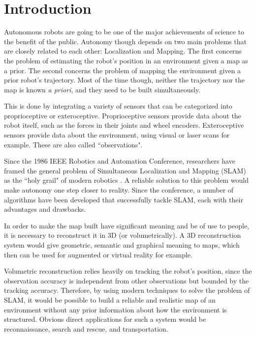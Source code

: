 \documentclass[11pt]{article}
\begin{document}
	\newpage
	\tableofcontents

	\newpage

	\section{Introduction}

Autonomous robots are going to be one of the major achievements of science to the benefit of the public. Autonomy though depends on two main problems that are closely related to each other: Localization and Mapping. The first concerns the problem of estimating the robot's position in an environment given a map as a prior. The second concerns the problem of mapping the environment given a prior robot's trajectory. Most of the time though, neither the trajectory nor the map is known \textit{a priori}, and they need to be built simultaneously. 

This is done by integrating a variety of sensors that can be categorized into proprioceptive or exteroceptive. Proprioceptive sensors provide data about the robot itself, such as the forces in their joints and wheel encoders. Exteroceptive sensors provide data about the environment, using visual or laser scans for example. These are also called ``observations".
	
Since the 1986 IEEE Robotics and Automation Conference, researchers have framed the general problem of Simultaneous Localization and Mapping (SLAM) as the ``holy grail" of modern robotics \cite{SLAMPartI}. A reliable solution to this problem would make autonomy one step closer to reality. Since the conference, a number of algorithms have been developed that successfully tackle SLAM, each with their advantages and drawbacks.
	
In order to make the map built have significant meaning and be of use to people, it is necessary to reconstruct it in 3D (or volumetrically). A 3D reconstruction system would give geometric, semantic and graphical meaning to maps, which then can be used for augmented or virtual reality for example.
	
Volumetric reconstruction relies heavily on tracking the robot's position, since the observation accuracy is independent from other observations but bounded by the tracking accuracy. Therefore, by using modern techniques to solve the problem of SLAM, it would be possible to build a reliable and realistic map of an environment without any prior information about how the environment is structured. Obvious direct applications for such a system would be reconnaissance, search and rescue, and transportation.
	
\end{document}
